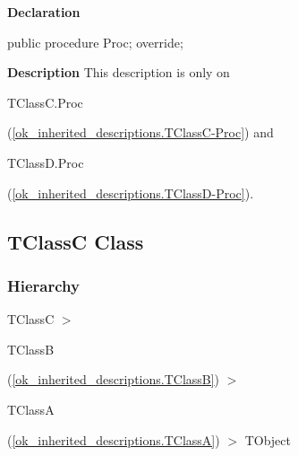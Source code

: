 \documentclass{report}
\newif\ifpdf
\begin{document}
\label{ok_inherited_descriptions.IInterfaceC-Proc}
\begin{list}{}{
\setlength{\itemindent}{0cm}
\setlength{\listparindent}{0cm}
\setlength{\leftmargin}{\evensidemargin}
\addtolength{\leftmargin}{\tmplength}
\settowidth{\labelsep}{X}
\addtolength{\leftmargin}{\labelsep}
\setlength{\labelwidth}{\tmplength}
}
\item[\textbf{Declaration}\hfill]
\ifpdf
\begin{flushleft}
\fi
\begin{ttfamily}
public procedure Proc; override;\end{ttfamily}

\ifpdf
\end{flushleft}
\fi

\par
\item[\textbf{Description}]
This description is only on \begin{ttfamily}TClassC.Proc\end{ttfamily}(\ref{ok_inherited_descriptions.TClassC-Proc}) and \begin{ttfamily}TClassD.Proc\end{ttfamily}(\ref{ok_inherited_descriptions.TClassD-Proc}).

\end{list}
\ifpdf
\subsection*{\large{\textbf{TClassC Class}}\normalsize\hspace{1ex}\hrulefill}
\else
\subsection*{TClassC Class}
\fi
\label{ok_inherited_descriptions.TClassC}
\subsubsection*{\large{\textbf{Hierarchy}}\normalsize\hspace{1ex}\hfill}
TClassC {$>$} \begin{ttfamily}TClassB\end{ttfamily}(\ref{ok_inherited_descriptions.TClassB}) {$>$} \begin{ttfamily}TClassA\end{ttfamily}(\ref{ok_inherited_descriptions.TClassA}) {$>$} 
TObject
\end{document}
